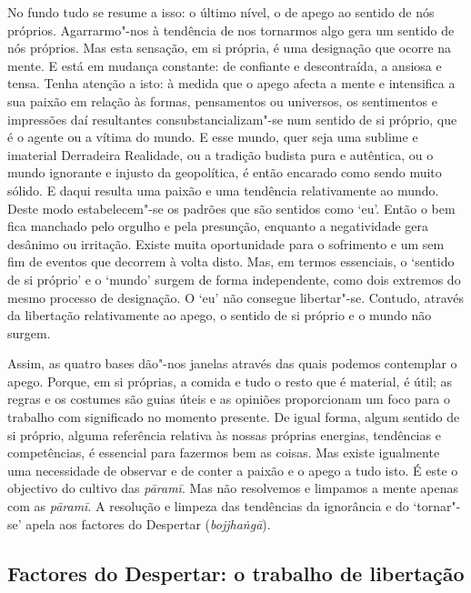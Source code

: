 No fundo tudo se resume a isso: o último nível, o de apego ao sentido de nós
próprios. Agarrarmo"-nos à tendência de nos tornarmos algo gera um sentido de
nós próprios. Mas esta sensação, em si própria, é uma designação que ocorre na
mente. E está em mudança constante: de confiante e descontraída, a ansiosa e
tensa. Tenha atenção a isto: à medida que o apego afecta a mente e intensifica a
sua paixão em relação às formas, pensamentos ou universos, os sentimentos e
impressões daí resultantes consubstancializam"-se num sentido de si próprio, que
é o agente ou a vítima do mundo. E esse mundo, quer seja uma sublime e imaterial
Derradeira Realidade, ou a tradição budista pura e autêntica, ou o mundo
ignorante e injusto da geopolítica, é então encarado como sendo muito sólido. E
daqui resulta uma paixão e uma tendência relativamente ao mundo. Deste modo
estabelecem"-se os padrões que são sentidos como `eu'. Então o bem fica manchado
pelo orgulho e pela presunção, enquanto a negatividade gera desânimo ou
irritação. Existe muita oportunidade para o sofrimento e um sem fim de eventos
que decorrem à volta disto. Mas, em termos essenciais, o `sentido de si próprio'
e o `mundo' surgem de forma independente, como dois extremos do mesmo processo
de designação. O `eu' não consegue libertar"-se. Contudo, através da libertação
relativamente ao apego, o sentido de si próprio e o mundo não surgem.

\enlargethispage{\baselineskip}

Assim, as quatro bases dão"-nos janelas através das quais podemos contemplar o
apego. Porque, em si próprias, a comida e tudo o resto que é material, é útil;
as regras e os costumes são guias úteis e as opiniões proporcionam um foco para
o trabalho com significado no momento presente. De igual forma, algum sentido de
si próprio, alguma referência relativa às nossas próprias energias, tendências e
competências, é essencial para fazermos bem as coisas. Mas existe igualmente uma
necessidade de observar e de conter a paixão e o apego a tudo isto. É este o
objectivo do cultivo das \emph{pāramī}. Mas não resolvemos e limpamos a mente
apenas com as \emph{pāramī}. A resolução e limpeza das tendências da ignorância
e do `tornar"-se' apela aos factores do Despertar (\emph{bojjhaṅgā}).

\subsection{Factores do Despertar: o trabalho de libertação}

